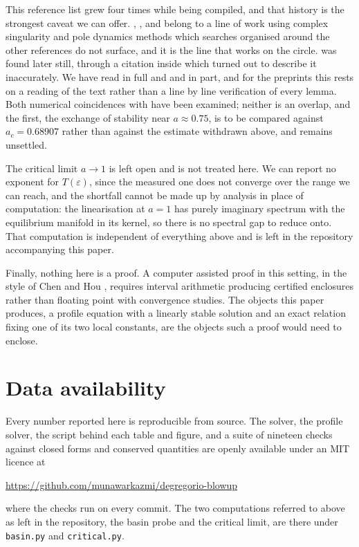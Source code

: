 \documentclass[11pt]{article}
\theoremstyle{definition}
\begin{document}
This reference list grew four times while being compiled, and that history is
the strongest caveat we can offer. \cite{lss2020}, \cite{slsa2025},
\cite{xu2026} and \cite{alss2024} belong to a line of work using complex
singularity and pole dynamics methods which searches organised around the other
references do not surface, and it is the line that works on the circle.
\cite{chenS1} was found later still, through a citation inside \cite{alss2024}
which turned out to describe it inaccurately. We have read \cite{lss2020} in
full and \cite{chenS1} and \cite{xu2026} in part, and for the preprints this
rests on a reading of the text rather than a line by line verification of every
lemma. Both numerical coincidences with \cite{htw2026} have been examined;
neither is an overlap, and the first, the exchange of stability near
$a\approx0.75$, is to be compared against $a_c = 0.68907$ rather than against
the estimate withdrawn above, and remains unsettled.

The critical limit $a\to1$ is left open and is not treated here. We can report
no exponent for $T(\varepsilon)$, since the measured one does not converge over
the range we can reach, and the shortfall cannot be made up by analysis in
place of computation: the linearisation at $a=1$ has purely imaginary spectrum
with the equilibrium manifold in its kernel, so there is no spectral gap to
reduce onto. That computation is independent of everything above and is left in
the repository accompanying this paper.

Finally, nothing here is a proof. A computer assisted proof in this setting, in
the style of Chen and Hou \cite{chenhou2022}, requires interval arithmetic
producing certified enclosures rather than floating point with convergence
studies. The objects this paper produces, a profile equation with a linearly
stable solution and an exact relation fixing one of its two local constants,
are the objects such a proof would need to enclose.

\section*{Data availability}
\label{sec:data}

Every number reported here is reproducible from source. The solver, the profile
solver, the script behind each table and figure, and a suite of nineteen checks
against closed forms and conserved quantities are openly available under an MIT
licence at
\begin{center}
\url{https://github.com/munawarkazmi/degregorio-blowup}
\end{center}
where the checks run on every commit. The two computations referred to above as
left in the repository, the basin probe and the critical limit, are there under
\texttt{basin.py} and \texttt{critical.py}.
\end{document}
